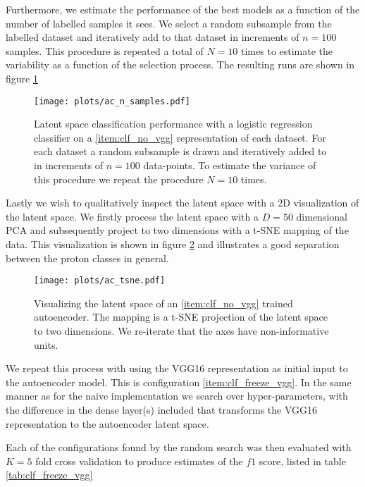 \noindent Furthermore, we estimate the performance of the best models as a function of the number of labelled samples it sees. We select a random subsample from the labelled dataset and iteratively add to that dataset in increments of $n=100$ samples. This procedure is repeated a total of $N=10$ times to estimate the variability as a function of the selection process. The resulting runs are shown in figure \ref{fig:ac_n_labelled}

\begin{figure}
\centering
\texttt{[image: plots/ac\_n\_samples.pdf]}
\caption[Autoencoder performance on labelled subsets]{Latent space classification performance with a logistic regression classifier on a \ref{item:clf_no_vgg} representation of each dataset. For each dataset a random subsample is drawn and iteratively added to in increments of $n=100$ data-points. To estimate the variance of this procedure we repeat the procedure $N=10$ times.}\label{fig:ac_n_labelled}
\end{figure}

\noindent Lastly we wish to qualitatively inspect the latent space with a 2D visualization of the latent space. We firstly process the latent space with a $D=50$ dimensional PCA and subsequently project to two dimensions with a t-SNE mapping of the data. This visualization is shown in figure \ref{fig:ac_tnse} and illustrates a good separation between the proton classes in general. 

\begin{figure}
\centering
\texttt{[image: plots/ac\_tsne.pdf]}
\caption[autoencoder latent space visualization]{Visualizing the latent space of an \ref{item:clf_no_vgg} trained autoencoder. The mapping is a t-SNE projection of the latent space to two dimensions. We re-iterate that the axes have non-informative units.}\label{fig:ac_tnse}
\end{figure}

We repeat this process with using the VGG16 representation as initial input to the autoencoder model. This is configuration \ref{item:clf_freeze_vgg}. In the same manner as for the naive implementation we search over hyper-parameters, with the difference in the dense layer(s) included that transforms the VGG16 representation to the autoencoder latent space.

Each of the configurations found by the random search was then evaluated with $K=5$ fold cross validation to produce estimates of the $f1$ score, listed in table \ref{tab:clf_freeze_vgg}

